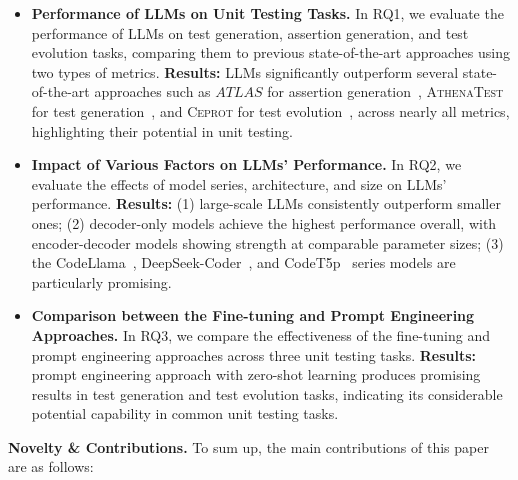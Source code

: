 \begin{itemize}[leftmargin=1em]
    \item \textbf{Performance of LLMs on Unit Testing Tasks.}  
    In RQ1, we evaluate the performance of LLMs on test generation, assertion generation, and test evolution tasks, comparing them to previous state-of-the-art approaches using two types of metrics.
    \textbf{Results:} LLMs significantly outperform several state-of-the-art approaches such as $ATLAS$ for assertion generation~\cite{watson_learning_2020}, \textsc{AthenaTest} for test generation~\cite{tufano_unit_2021}, and \textsc{Ceprot} for test evolution~\cite{hu_identify_2023}, across nearly all metrics, highlighting their potential in unit testing.

    \item \textbf{Impact of Various Factors on LLMs' Performance.}  
    In RQ2, we evaluate the effects of model series, architecture, and size on LLMs' performance. 
    \textbf{Results:} (1) large-scale LLMs consistently outperform smaller ones; (2) decoder-only models achieve the highest performance overall, with encoder-decoder models showing strength at comparable parameter sizes; (3) the CodeLlama~\cite{roziere_code_2024}, DeepSeek-Coder~\cite{guo_deepseek-coder_2024}, and CodeT5p~\cite{wang_codet5_2023+} series models are particularly promising.

    \item \textbf{Comparison between the Fine-tuning and Prompt Engineering Approaches.}
    In RQ3, we compare the effectiveness of the fine-tuning and prompt engineering approaches across three unit testing tasks. 
    \textbf{Results:} prompt engineering approach with zero-shot learning produces promising results in test generation and test evolution tasks, indicating its considerable potential capability in common unit testing tasks.

\end{itemize}

\textbf{Novelty \& Contributions.}
To sum up, the main contributions of this paper are as follows:

